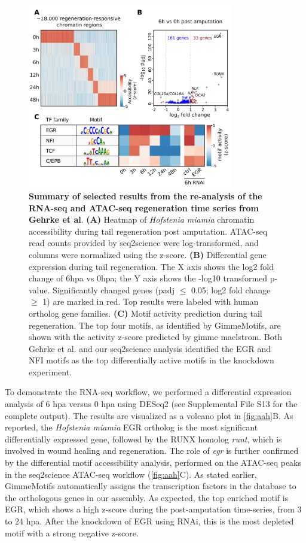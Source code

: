 \begin{figure}
	\centering
	\includegraphics[width=0.8\textwidth]{ch.seq2science/imgs/figure_acoel.png}
	\caption{\label{fig:aah} \textbf{Summary of selected results from the re-analysis of the RNA-seq and ATAC-seq regeneration time series from Gehrke et al}. \textbf{(A)} Heatmap of \textit{Hofstenia miamia} chromatin accessibility during tail regeneration post amputation. ATAC-seq read counts provided by seq2science were log-transformed, and columns were normalized using the z-score. \textbf{(B)} Differential gene expression during tail regeneration. The X axis shows the log2 fold change of 6hpa vs 0hpa; the Y axis shows the -log10 transformed p-value. Significantly changed genes (padj $\leq$ 0.05; log2 fold change $\geq$ 1) are marked in red. Top results were labeled with human ortholog gene families. \textbf{(C)} Motif activity prediction during tail regeneration. The top four motifs, as identified by GimmeMotifs, are shown with the activity z-score predicted by gimme maelstrom. Both Gehrke et al. and our seq2science analysis identified the EGR and NFI motifs as the top differentially active motifs in the knockdown experiment.}
\end{figure}

To demonstrate the RNA-seq workflow, we performed a differential expression analysis of 6 hpa versus 0 hpa using DESeq2 (see  Supplemental File S13 for the complete output). The results are visualized as a volcano plot in \autoref{fig:aah}B. As reported, the \textit{Hofstenia miamia} EGR ortholog is the most significant differentially expressed gene, followed by the RUNX homolog \textit{runt}, which is involved in wound healing and regeneration. The role of \textit{egr} is further confirmed by the differential motif accessibility analysis, performed on the ATAC-seq peaks in the seq2science ATAC-seq workflow (\autoref{fig:aah}C). As stated earlier, GimmeMotifs automatically assigns the transcription factors in the database to the orthologous genes in our assembly. As expected, the top enriched motif is EGR, which shows a high z-score during the post-amputation time-series, from 3 to 24 hpa. After the knockdown of EGR using RNAi, this is the most depleted motif with a strong negative z-score. 


